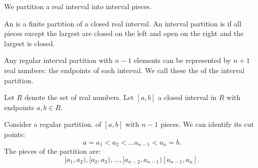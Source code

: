 
\sbasic



\sstart



We partition
a real interval
into interval pieces.


An
is a finite partition of a closed real interval.
An interval partition is
if all pieces except the largest are
closed on the left and open
on the right and the largest
is closed.

Any regular interval partition with
$n-1$ elements
can be represented by
$n+1$ real numbers: the
endpoints of each interval.
We call these
the
of the interval partition.


Let $R$ denote the set of
real numbers.
Let $[a, b]$ a closed
interval in $R$ with
endpoints $a, b \in R$.

Consider a regular partition.
of $[a,b]$ with $n-1$ pieces.
We can identify its
cut points:
\[
  a = a_1 < a_2 < \dots a_{n-1} < a_n = b.
\]
The pieces of the partition
are:
\[
[a_1, a_2),
[a_2, a_3),
\dots,
[a_{n-2}, a_{n-1})
[a_{n-1}, a_n].
\]

\strats
